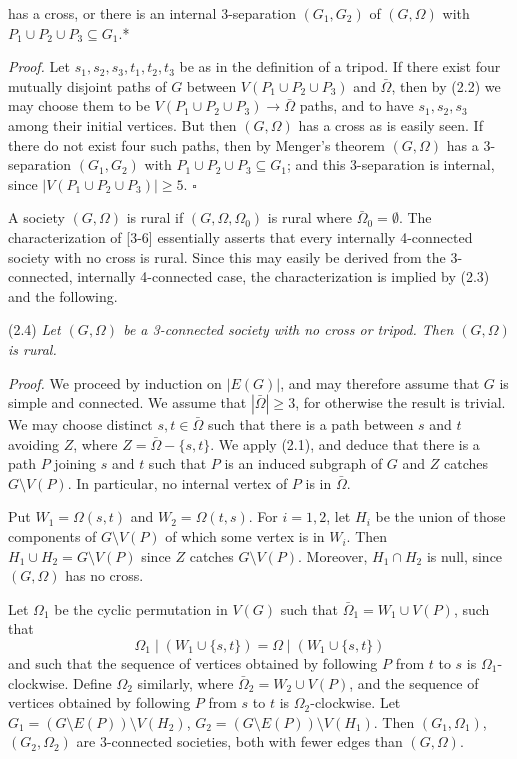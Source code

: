 \noindent has a cross, or there is an internal 3-separation $(G_1, G_2)$ of $(G, \Omega)$ with $P_1 \cup P_2 \cup P_3 \subseteq G_1$.*

\textit{Proof.} Let $s_1, s_2, s_3, t_1, t_2, t_3$ be as in the definition of a tripod. If there exist four mutually disjoint paths of $G$ between $V(P_1 \cup P_2 \cup P_3)$ and $\bar{\Omega}$, then by (2.2) we may choose them to be $V(P_1 \cup P_2 \cup P_3) \to \bar{\Omega}$ paths, and to have $s_1, s_2, s_3$ among their initial vertices. But then $(G, \Omega)$ has a cross as is easily seen. If there do not exist four such paths, then by Menger's theorem $(G, \Omega)$ has a 3-separation $(G_1, G_2)$ with $P_1 \cup P_2 \cup P_3 \subseteq G_1$; and this 3-separation is internal, since $|V(P_1 \cup P_2 \cup P_3)| \ge 5$. $\square$

A society $(G, \Omega)$ is rural if $(G, \Omega, \Omega_0)$ is rural where $\bar{\Omega}_0 = \emptyset$. The characterization of [3-6] essentially asserts that every internally 4-connected society with no cross is rural. Since this may easily be derived from the 3-connected, internally 4-connected case, the characterization is implied by (2.3) and the following.

\stmt
(2.4) \textit{Let $(G, \Omega)$ be a 3-connected society with no cross or tripod. Then $(G, \Omega)$ is rural.}

\textit{Proof.} We proceed by induction on $|E(G)|$, and may therefore assume that $G$ is simple and connected. We assume that $|\bar{\Omega}| \ge 3$, for otherwise the result is trivial. We may choose distinct $s, t \in \bar{\Omega}$ such that there is a path between $s$ and $t$ avoiding $Z$, where $Z = \bar{\Omega} - \{s, t\}$. We apply (2.1), and deduce that there is a path $P$ joining $s$ and $t$ such that $P$ is an induced subgraph of $G$ and $Z$ catches $G \setminus V(P)$. In particular, no internal vertex of $P$ is in $\bar{\Omega}$.

Put $W_1 = \Omega(s, t)$ and $W_2 = \Omega(t, s)$. For $i = 1, 2$, let $H_i$ be the union of those components of $G \setminus V(P)$ of which some vertex is in $W_i$. Then $H_1 \cup H_2 = G \setminus V(P)$ since $Z$ catches $G \setminus V(P)$. Moreover, $H_1 \cap H_2$ is null, since $(G, \Omega)$ has no cross.

Let $\Omega_1$ be the cyclic permutation in $V(G)$ such that $\bar{\Omega}_1 = W_1 \cup V(P)$, such that
\begin{equation*}
\Omega_1 \mid (W_1 \cup \{s, t\}) = \Omega \mid (W_1 \cup \{s, t\})
\end{equation*}
and such that the sequence of vertices obtained by following $P$ from $t$ to $s$ is $\Omega_1$-clockwise. Define $\Omega_2$ similarly, where $\bar{\Omega}_2 = W_2 \cup V(P)$, and the sequence of vertices obtained by following $P$ from $s$ to $t$ is $\Omega_2$-clockwise. Let $G_1 = (G \setminus E(P)) \setminus V(H_2)$, $G_2 = (G \setminus E(P)) \setminus V(H_1)$. Then $(G_1, \Omega_1)$, $(G_2, \Omega_2)$ are 3-connected societies, both with fewer edges than $(G, \Omega)$.

